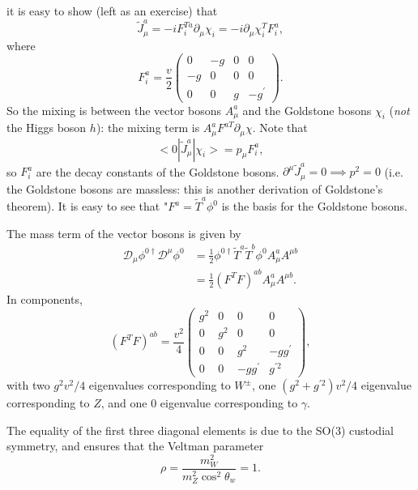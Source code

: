 it is easy to show (left as an exercise) that
\begin{equation}
\tilde{J}_\mu^a = -i F^{T a}_i \partial_\mu \chi_i = -i \partial_\mu \chi_i^T F_i^a,
\end{equation}
where
\[F_i^a = \frac{v}{2} \left( \begin{array}{cccc}
0 & -g & 0 & 0 \\
-g & 0 & 0 & 0 \\
0 & 0 & g & -g^\prime 
\end{array} \right). \]
So the mixing is between the vector bosons $A_\mu^a$ and the Goldstone bosons $\chi_i$ (\textit{not} the Higgs boson $h$): the mixing term is $A_\mu^a F^{a T} \partial_\mu \chi$. Note that
\begin{equation}
<0|\tilde{J}_\mu^a|\chi_i> = p_\mu F^a_i,
\end{equation}
so $F_i^a$ are the decay constants of the Goldstone bosons. $\partial^\mu \tilde{J}_\mu^a = 0 \implies p^2=0$ (i.e. the Goldstone bosons are massless: this is another derivation of Goldstone's theorem). It is easy to see that "$F^a = \tilde{T}^a \phi^0$ is the basis for the Goldstone bosons.

The mass term of the vector bosons is given by
\begin{equation}
\begin{split}
\mathcal{D}_\mu \phi^{0 \dagger} \mathcal{D}^\mu \phi^0 &= \frac{1}{2} \phi^{0 \dagger} \tilde{T}^a \tilde{T}^b \phi^0 A_\mu^a A^{\mu b} \\
&= \frac{1}{2}(F^TF)^{ab} A_\mu^a A^{\mu b}.
\end{split}
\end{equation}
In components,
\[(F^TF)^{ab} = \frac{v^2}{4} \left( \begin{array}{cccc}
g^2 & 0 & 0 & 0 \\
0 & g^2 & 0 & 0 \\
0 & 0 & g^2 & -gg^\prime \\
0 & 0 & - gg^\prime & g^{\prime 2} 
\end{array} \right), \]
with two $g^2v^2/4$ eigenvalues corresponding to $W^\pm$, one $(g^2 + g^{\prime 2})v^2/4$ eigenvalue corresponding to $Z$, and one $0$ eigenvalue corresponding to $\gamma$.

The equality of the first three diagonal elements is due to the SO(3) custodial symmetry, and ensures that the Veltman parameter
\begin{equation}
\rho = \frac{m_W^2}{m_Z^2 \cos^2\theta_w} = 1.
\end{equation}
%
